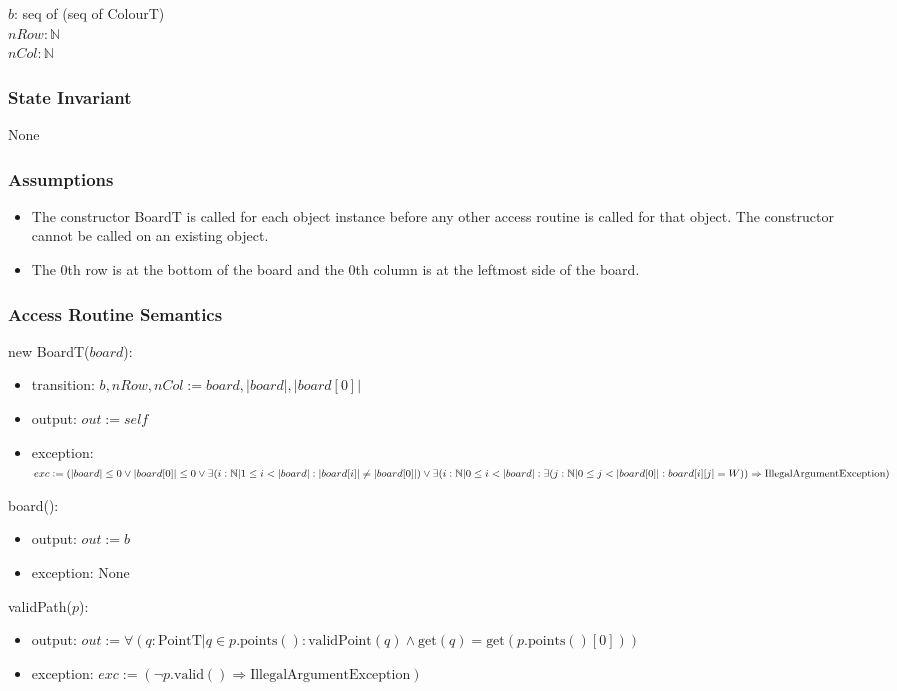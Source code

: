 \documentclass[12pt]{article}
\newcommand{\Implies}{\Rightarrow}
\begin{document}
$b$: seq of (seq of ColourT)\\
$nRow: \mathbb{N}$\\
$nCol: \mathbb{N}$

\subsubsection* {State Invariant}

None

\subsubsection* {Assumptions}

\begin{itemize}
	\item The constructor BoardT is called for each object instance before any other
	access routine is called for that object.  The constructor cannot be called on
	an existing object.
	\item The 0th row is at the bottom of the board and the 0th column is at the leftmost side of the board.
\end{itemize}

\subsubsection* {Access Routine Semantics}

new BoardT($board$):
\begin{itemize}
	\item transition: $b, nRow, nCol := board, |board|, |board[0]|$
	\item output: $out := \mathit{self}$
	\item exception: $exc := (|board| \le 0 \lor |board[0]| \le 0 \lor \\
	\exists (i : \mathbb{N} | 1 \le i < |board| : |board[i]| \neq |board[0]|) \lor \\
	 \exists (i : \mathbb{N} | 0 \le i < |board| : \exists(j : \mathbb{N} | 0 \le j < |board[0]| : board[i][j] = W)) \Implies \mbox{IllegalArgumentException})$
\end{itemize}

\noindent board():
\begin{itemize}
	\item output: $out := b$
	\item exception: None
\end{itemize}

\noindent validPath($p$):
\begin{itemize}
	\item output: $out := \forall(q : \mbox{PointT} | q \in p.\mbox{points}() : \mbox{validPoint}(q) \land \mbox{get}(q) = \mbox{get}(p.\mbox{points}()[0]))$
	\item exception: $exc := (\lnot p.\mbox{valid}() \Implies \mbox{IllegalArgumentException})$
\end{itemize}
\end{document}
